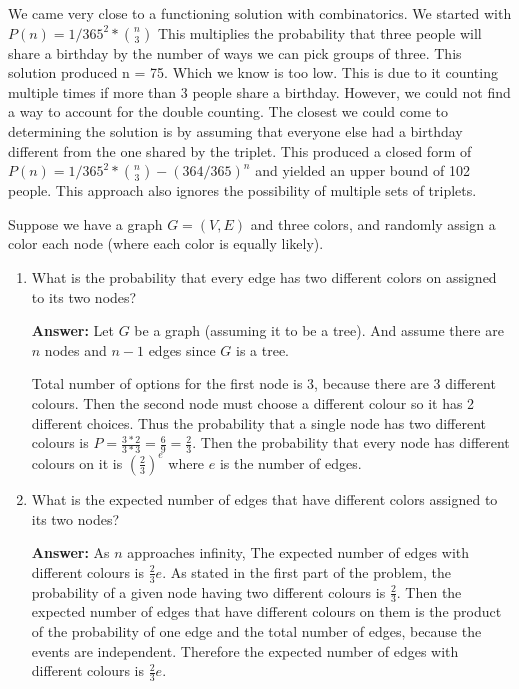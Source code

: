 \documentclass{article}
\begin{document}
We came very close to a functioning solution with combinatorics. We started with $P(n) = 1/365^2 *  {n \choose 3}$ This multiplies the probability that three people will share a birthday by the number of ways we can pick groups of three.
This solution produced n = 75. Which we know is too low. This is due to it counting multiple times if more than 3 people share a birthday.
However, we could not find a way to account for the double counting. The closest we could come to determining the solution is by assuming that everyone else had a birthday different from the one shared by the triplet.
This produced a closed form of $P(n) = 1/365^2 * {n \choose 3}- (364/365)^n$ and yielded an upper bound of 102 people.
This approach also ignores the possibility of multiple sets of triplets.


\nextprob
Suppose we have a graph $G=(V,E)$ and three colors, and randomly assign a color
each node (where each color is equally likely).
\begin{enumerate}
\item What is the probability that every edge has two different colors on
assigned to its two nodes?

\textbf{Answer:} Let $G$ be a graph (assuming it to be a tree). And assume there are $n$ nodes and $n-1$ edges since $G$ is a tree.

Total number of options for the first node is 3, because there are 3 different colours.
Then the second node must choose a different colour so it has 2 different choices.
Thus the probability that a single node has two different colours is $P = \frac{3*2}{3*3} = \frac{6}{9} = \frac{2}{3}$.
Then the probability that every node has different colours on it is $(\frac{2}{3})^e$ where $e$ is the number of edges.

\item What is the expected number of edges that have different colors
assigned to its two nodes?

\textbf{Answer:} As $n$ approaches infinity, The expected number of edges with different colours is $\frac{2}{3} e$.
As stated in the first part of the problem, the probability of a given node having two different colours is $\frac{2}{3}$.
Then the expected number of edges that have different colours on them is the product of the probability of one edge and the total number of edges,
because the events are independent. Therefore the expected number of edges with different colours is $\frac{2}{3} e$.

\end{enumerate}
\end{document}
